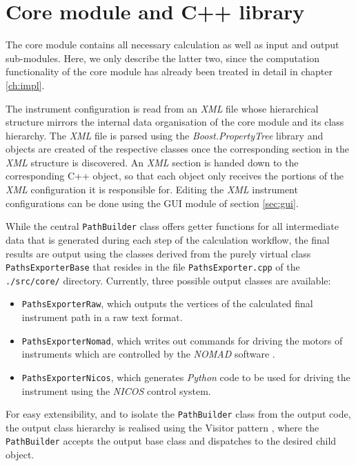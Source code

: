 \section{Core module and C++ library}
\label{sec:library}
The core module contains all necessary calculation as well as input and output sub-modules. 
Here, we only describe the latter two, since the computation functionality of the core module 
has already been treated in detail in chapter \ref{ch:impl}.

The instrument configuration is read from an \textit{XML} file whose hierarchical structure
mirrors the internal data organisation of the core module and its class hierarchy.
The \textit{XML} file is parsed using the \textit{Boost.PropertyTree} library \cite{web_boost_proptree}
and objects are created of the respective classes once the corresponding section in the \textit{XML}
structure is discovered. An \textit{XML} section is handed down to the corresponding C++ object,
so that each object only receives the portions of the \textit{XML} configuration it is responsible for.
Editing the \textit{XML} instrument configurations can be done using the GUI module of section \ref{sec:gui}.

While the central \lstinline[language=C++]|PathBuilder| class offers getter functions for all intermediate
data that is generated during each step of the calculation workflow, the final results are output using
the classes derived from the purely virtual class \lstinline[language=C++]|PathsExporterBase| that resides
in the file \lstinline|PathsExporter.cpp| of the \lstinline|./src/core/| directory. 
Currently, three possible output classes are available:
\begin{itemize}
	\item \lstinline[language=C++]|PathsExporterRaw|, which outputs the vertices of the calculated 
		final instrument path in a raw text format.
	\item \lstinline[language=C++]|PathsExporterNomad|, which writes out commands for driving the
		motors of instruments which are controlled by the \textit{NOMAD} software \cite{web_NOMAD}.
	\item \lstinline[language=C++]|PathsExporterNicos|, which generates \textit{Python} code to
		be used for driving the instrument using the \textit{NICOS} \cite{web_NICOS} control system.
\end{itemize}
For easy extensibility, and to isolate the \lstinline[language=C++]|PathBuilder| class from the output
code, the output class hierarchy is realised using the Visitor pattern \cite{wiki_visitor} 
\cite[Ch. 4.4.9, pp. 161-167]{FUH_prog2019}, where the \lstinline[language=C++]|PathBuilder|
accepts the output base class and dispatches to the desired child object.

